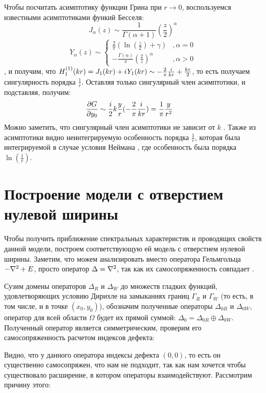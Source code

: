 Чтобы посчитать асимптотику функции Грина при $r \to 0$, воспользуемся известными асимптотиками функий Бесселя:
\[
J_\alpha(z) \sim \frac{1}{\Gamma(\alpha+1)} \left( \frac{z}{2} \right) ^\alpha
\]
\[
Y_\alpha(z) \sim
\begin{cases}
\frac{2}{\pi} \left ( \ln \left (\frac{z}{2} \right ) + \gamma \right )  &, \alpha=0\\
-\frac{\Gamma(\alpha)}{\pi} \left( \frac{2}{z} \right) ^\alpha &, \alpha > 0
\end{cases}
\]
, и получим, что $H_{1}^{(1)}(k r) = J_1(k r) + {i\mkern1mu} Y_1(k r) \sim - \frac{2}{\pi} \frac{{i\mkern1mu} }{k r} + \frac{k r}{2}$, то есть получаем сингулярность порядка $\frac{1}{r}$. Оставляя только сингулярный член асимптотики, и подставляя, получим:
\begin{align*}
\pdv{G}{y_0} (x, y, 0, 0; k)
&\sim \frac{i}{2} k \frac{y}{r} (- \frac{2}{\pi} \frac{{i\mkern1mu} }{k r}) = \frac{1}{\pi} \frac{y}{r^2}
\end{align*}
Можно заметить, что сингулярный член асимптотики не зависит от $k$ . Также из асимптотики видно неинтегрируемую особенность порядка $\frac{1}{r}$, которая была интегрируемой в случае условия Неймана , где особенность была порядка $\ln(\frac{1}{r})$.


\section{Построение модели с отверстием нулевой ширины}
Чтобы получить приближение спектральных характеристик и проводящих свойств данной модели, построем соответствующую ей модель с отверстием нулевой ширины. Заметим, что можем анализировать вместо оператора Гельмгольца $-\laplacian + E$, просто оператор $\Delta = \laplacian$, так как их самосопряженность совпадает .

Сузим домены операторов $\Delta_R$ и $\Delta_W$ до множеств гладких функций, удовлетворяющих условию Дирихле на замыканиях границ $\Gamma_R$ и $\Gamma_W$ (то есть, в том числе, и в точке $(x_0, y_0)$), обозначим полученные операторы $\Delta_{0R}$ и $\Delta_{0W}$, оператор для всей области $\Omega$ будет их прямой суммой: $\Delta_0 = \Delta_{0R} \oplus \Delta_{0W}$. Полученный оператор является симметрическим, проверим его самосопряженность расчетом индексов дефекта:


Видно, что у данного оператора индексы дефекта $(0, 0)$, то есть он существенно самосопряжен, что нам не подходит, так как нам хочется чтобы существовало расширение, в котором операторы взаимодействуют. Рассмотрим причину этого:

